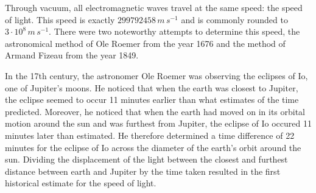 



\thispagestyle{plain}



Through vacuum, all electromagnetic waves travel at the same speed: the speed of light. This speed is exactly $299 792 458\, m\, s^{-1}$ and is commonly rounded to $3 \cdot 10^8\, m\, s^{-1}$. There were two noteworthy attempts to determine this speed, the astronomical method of Ole Roemer from the year 1676 and the method of Armand Fizeau from the year 1849.


In the 17th century, the astronomer Ole Roemer was observing the eclipses of Io, one of Jupiter's moons. He noticed that when the earth was closest to Jupiter, the eclipse seemed to occur 11 minutes earlier than what estimates of the time predicted. Moreover, he noticed that when the earth had moved on in its orbital motion around the sun and was furthest from Jupiter, the eclipse of Io occured 11 minutes later than estimated. He therefore determined a time difference of 22 minutes for the eclipse of Io across the diameter of the earth's orbit around the sun. Dividing the displacement of the light between the closest and furthest distance between earth and Jupiter by the time taken resulted in the first historical estimate for the speed of light.

